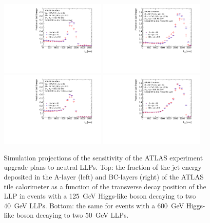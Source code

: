 \begin{figure}[hbtp]
\begin{center}
\includegraphics[width=0.47\textwidth]{figures/caloratio1.pdf}
\includegraphics[width=0.47\textwidth]{figures/caloratio2.pdf}\\
\includegraphics[width=0.47\textwidth]{figures/caloratio3.pdf}
\includegraphics[width=0.47\textwidth]{figures/caloratio4.pdf}\\
\caption{Simulation projections of the sensitivity of the ATLAS experiment upgrade plans to neutral LLPs. Top: the fraction of the jet energy deposited in the A-layer (left) and BC-layers (right) of the ATLAS tile calorimeter as a function of the transverse decay position of the LLP in events with a 125~GeV Higgs-like boson decaying to two 40~GeV LLPs. Bottom: the same for events with a 600~GeV Higgs-like boson decaying to two 50~GeV LLPs.}
\label{fig:Caloratio}
\end{center}
\end{figure}


